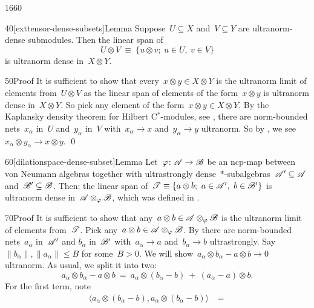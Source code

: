 \begin{parsec}{1660}
\begin{point}{40}[exttensor-dense-subsets]{Lemma}
Suppose~$U \subseteq X$ and~$V \subseteq Y$
    are ultranorm-dense submodules.
Then the linear span of
\begin{equation*}
    U \otimes V \ \equiv\  \{ u \otimes v;\  u \in U,\ v \in V\}
\end{equation*}
is ultranorm dense in~$X \otimes Y$.
\begin{point}{50}{Proof}%
It is sufficient to show that every~$x \otimes y \in X \otimes Y$
    is the ultranorm limit of elements from~$U \otimes V$
    as the linear span of elements of the form~$x \otimes y$
    is ultranorm dense in~$X \otimes Y$.
So pick any element of the form~$x \otimes y \in X \otimes Y$.
By the Kaplansky density theorem for Hilbert C$^*$-modules,
 see ,
    there are norm-bounded nets~$x_\alpha$ in~$U$
    and~$y_\alpha$ in~$V$
    with~$x_\alpha \to x$ and~$y_\alpha \to y$ ultranorm.
So by ,
    we see~$x_\alpha \otimes y_\alpha \to x \otimes y$. \qed
\end{point}
\end{point}
\begin{point}{60}[dilationspace-dense-subset]{Lemma}%
Let~$\varphi \colon \mathscr{A} \to \mathscr{B}$ be an ncp-map between von Neumann algebras
    together with ultrastrongly
    dense~$*$-subalgebras~$\mathscr{A}' \subseteq \mathscr{A}$
        and~$\mathscr{B}' \subseteq \mathscr{B}$.
Then: the linear span
    of~$ \mathscr{T}  \equiv \{ a \otimes b;\ a \in \mathscr{A}', \ b\in \mathscr{B}'\}$
is ultranorm dense in~$\mathscr{A} \otimes_\varphi \mathscr{B}$,
which was defined in  .
\begin{point}{70}{Proof}%
It is sufficient to show that any~$a\otimes b \in \mathscr{A} \otimes_\varphi \mathscr{B}$
    is the ultranorm limit of elements from~$\mathscr{T}$.
    Pick any~$a\otimes b\in \mathscr{A} \otimes_\varphi \mathscr{B}$.
By 
    there are norm-bounded nets~$a_\alpha$ in~$\mathscr{A}'$ and
    $b_\alpha$ in~$\mathscr{B}'$
    with~$a_\alpha \to a$ and~$b_\alpha \to b$ ultrastrongly.
Say~$\|b_\alpha \|, \|a_\alpha\| \leq B$ for some~$B > 0$.
We will show~$a_\alpha \otimes b_\alpha - a\otimes b \to 0$ ultranorm.
As usual, we split it into two:
\begin{equation*}
a_\alpha \otimes b_\alpha - a \otimes b
\ = \ a_\alpha \otimes(b_\alpha -b )\  +\  (a_\alpha - a) \otimes b.
\end{equation*}
For the first term, note
\begin{align*}
    \langle a_\alpha \otimes (b_\alpha  - b),
    a_\alpha \otimes (b_\alpha  - b) \rangle
    & \ = \ 

\end{align*}
\end{point}
\end{point}
\end{parsec}
